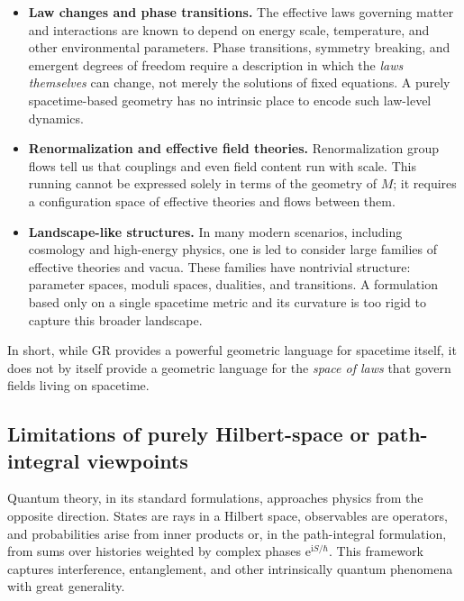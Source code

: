 \documentclass[11pt]{book}
\newcommand{\Base}{\ensuremath{M}}
\theoremstyle{plain}
\theoremstyle{definition}
\theoremstyle{remark}
\begin{document}
\begin{itemize}
  \item \textbf{Law changes and phase transitions.}
        The effective laws governing matter and interactions are
        known to depend on energy scale, temperature, and other
        environmental parameters. Phase transitions, symmetry
        breaking, and emergent degrees of freedom require a
        description in which the \emph{laws themselves} can change,
        not merely the solutions of fixed equations. A purely
        spacetime-based geometry has no intrinsic place to encode
        such law-level dynamics.
  \item \textbf{Renormalization and effective field theories.}
        Renormalization group flows tell us that couplings and
        even field content run with scale. This running cannot be
        expressed solely in terms of the geometry of $\Base$; it
        requires a configuration space of effective theories and
        flows between them.
  \item \textbf{Landscape-like structures.}
        In many modern scenarios, including cosmology and high-energy
        physics, one is led to consider large families of effective
        theories and vacua. These families have nontrivial structure:
        parameter spaces, moduli spaces, dualities, and transitions.
        A formulation based only on a single spacetime metric and
        its curvature is too rigid to capture this broader landscape.
\end{itemize}

In short, while GR provides a powerful geometric language for
spacetime itself, it does not by itself provide a geometric language
for the \emph{space of laws} that govern fields living on spacetime.

\subsection{Limitations of purely Hilbert-space or path-integral viewpoints}
\label{subsec:limit-quantum}



Quantum theory, in its standard formulations, approaches physics
from the opposite direction. States are rays in a Hilbert space,
observables are operators, and probabilities arise from inner
products or, in the path-integral formulation, from sums over
histories weighted by complex phases $\mathrm{e}^{\mathrm{i}S/\hbar}$.
This framework captures interference, entanglement, and other
intrinsically quantum phenomena with great generality.
\end{document}
